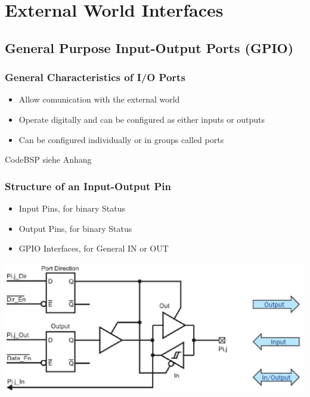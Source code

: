 \section{External World Interfaces}
\subsection{General Purpose Input-Output Ports (GPIO) }
\subsubsection{General Characteristics of I/O Ports}
\begin{itemize}
	\item Allow comunication with the external world
	\item Operate digitally and can be configured as either inputs or outputs
	\item Can be configured individually or in groups called ports
\end{itemize}
CodeBSP siehe Anhang \label{GPIO}
\begin{multicols}{2}
	\subsubsection{Structure of an Input-Output Pin}
	\begin{itemize}
		\item Input Pins, for binary Status
		\item Output Pins, for binary Status
		\item \acs{GPIO} Interfaces, for General IN or OUT
	\end{itemize}	
	\includegraphics[width=\linewidth]{images/IOStructure}  
\end{multicols}

